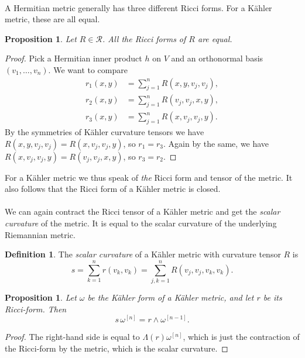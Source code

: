 \documentclass[11pt]{article}
\newtheorem{prop}[theo]{Proposition}
\theoremstyle{definition}
\newtheorem{defi}[theo]{Definition}
\newcommand{\cc}[1]{\mathcal{#1}}
\def\^#1{^{[#1]}}
\begin{document}
\paragraph{}
A Hermitian metric generally has three different Ricci forms. For a K\"ahler metric, these are all equal.

\begin{prop}
Let $R \in \cc R$. All the Ricci forms of $R$ are equal.
\end{prop}

\begin{proof}
  Pick a Hermitian inner product $h$ on $V$ and an orthonormal basis $(v_1,\ldots,v_n)$. We want to compare
\begin{align*}
r_1(x,y) &= \sum_{j=1}^n R(x,y,v_j,v_j),
\\
r_2(x,y) &= \sum_{j=1}^n R(v_j, v_j, x,y),
\\
r_3(x,y) &= \sum_{j=1}^n R(x,v_j,v_j,y).
\end{align*}
By the symmetries of K\"ahler curvature tensors we have $R(x,y,v_j,v_j) = R(x,v_j,v_j,y)$, so $r_1 = r_3$. Again by the same, we have $R(x,v_j,v_j,y) = R(v_j,v_j,x,y)$, so $r_3 = r_2$.
\end{proof}

For a K\"ahler metric we thus speak of \emph{the} Ricci form and tensor of the metric. It also follows that the Ricci form of a K\"ahler metric is closed.


\paragraph{}
We can again contract the Ricci tensor of a K\"ahler metric and get the \emph{scalar curvature} of the metric. It is equal to the scalar curvature of the underlying Riemannian metric.

\begin{defi}
The \emph{scalar curvature} of a K\"ahler metric with curvature tensor $R$ is
$$
s = \sum_{k=1}^n r(v_k,v_k) = \sum_{j,k=1}^n R(v_j,v_j,v_k,v_k).
$$
\end{defi}


\begin{prop}
Let $\omega$ be the K\"ahler form of a K\"ahler metric, and let $r$ be its Ricci-form. Then
$$
s \, \omega\^{n} = r \wedge \omega\^{n-1}.
$$
\end{prop}

\begin{proof}
The right-hand side is equal to $\Lambda(r) \omega\^n$, which is just the contraction of the Ricci-form by the metric, which is the scalar curvature.
\end{proof}
\end{document}
